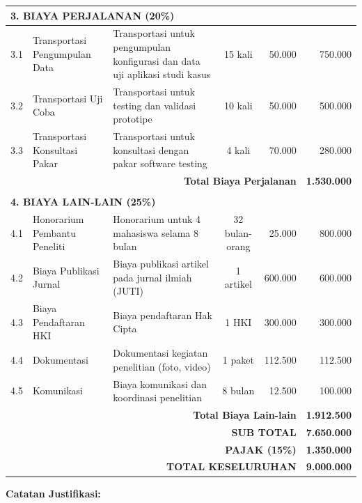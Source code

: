 {\begin{longtable}{|c|p{2.5cm}|p{3.5cm}|c|r|r|}
\multicolumn{6}{|l|}{\textbf{3. BIAYA PERJALANAN (20\%)}} \\
\hline
3.1 & Transportasi Pengumpulan Data & Transportasi untuk pengumpulan konfigurasi dan data uji aplikasi studi kasus & 15 kali & 50.000 & 750.000 \\
\hline
3.2 & Transportasi Uji Coba & Transportasi untuk testing dan validasi prototipe & 10 kali & 50.000 & 500.000 \\
\hline
3.3 & Transportasi Konsultasi Pakar & Transportasi untuk konsultasi dengan pakar software testing & 4 kali & 70.000 & 280.000 \\
\hline
\multicolumn{5}{|r|}{\textbf{Total Biaya Perjalanan}} & \textbf{1.530.000} \\
\hline
\multicolumn{6}{c}{} \\
\hline

\multicolumn{6}{|l|}{\textbf{4. BIAYA LAIN-LAIN (25\%)}} \\
\hline
4.1 & Honorarium Pembantu Peneliti & Honorarium untuk 4 mahasiswa selama 8 bulan & 32 bulan-orang & 25.000 & 800.000 \\
\hline
4.2 & Biaya Publikasi Jurnal & Biaya publikasi artikel pada jurnal ilmiah (JUTI) & 1 artikel & 600.000 & 600.000 \\
\hline
4.3 & Biaya Pendaftaran HKI & Biaya pendaftaran Hak Cipta & 1 HKI & 300.000 & 300.000 \\
\hline
4.4 & Dokumentasi & Dokumentasi kegiatan penelitian (foto, video) & 1 paket & 112.500 & 112.500 \\
\hline
4.5 & Komunikasi & Biaya komunikasi dan koordinasi penelitian & 8 bulan & 12.500 & 100.000 \\
\hline
\multicolumn{5}{|r|}{\textbf{Total Biaya Lain-lain}} & \textbf{1.912.500} \\
\hline
\multicolumn{5}{|r|}{\textbf{SUB TOTAL}} & \textbf{7.650.000} \\
\hline
\multicolumn{5}{|r|}{\textbf{PAJAK (15\%)}} & \textbf{1.350.000} \\
\hline
\multicolumn{5}{|r|}{\textbf{TOTAL KESELURUHAN}} & \textbf{9.000.000} \\
\hline
\end{longtable}
}

\vspace{1cm}

\noindent
\textbf{Catatan Justifikasi:}

